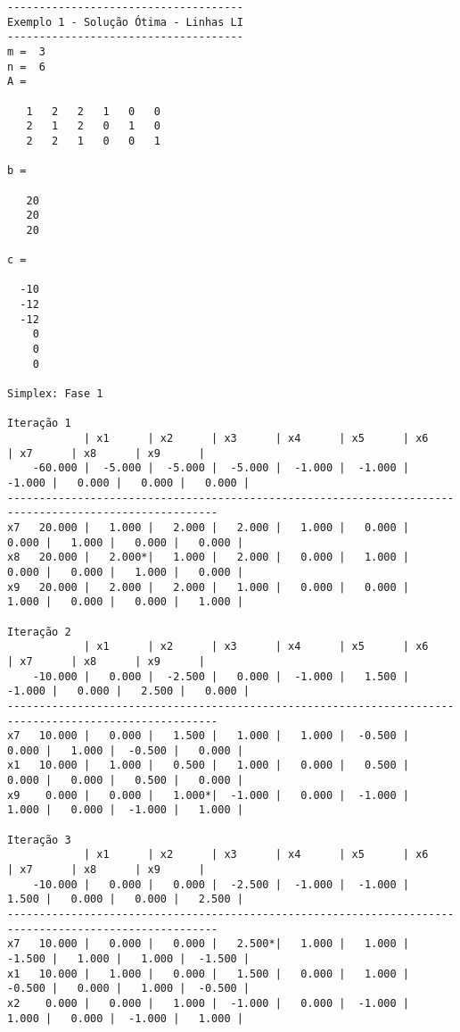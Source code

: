 \documentclass[12pt,a4paper]{article}
\begin{document}
\begin{tiny}
\begin{verbatim}
-------------------------------------
Exemplo 1 - Solução Ótima - Linhas LI
-------------------------------------
m =  3
n =  6
A =

   1   2   2   1   0   0
   2   1   2   0   1   0
   2   2   1   0   0   1

b =

   20
   20
   20

c =

  -10
  -12
  -12
    0
    0
    0

Simplex: Fase 1

Iteração 1
            | x1      | x2      | x3      | x4      | x5      | x6      | x7      | x8      | x9      |
    -60.000 |  -5.000 |  -5.000 |  -5.000 |  -1.000 |  -1.000 |  -1.000 |   0.000 |   0.000 |   0.000 |
-------------------------------------------------------------------------------------------------------
x7   20.000 |   1.000 |   2.000 |   2.000 |   1.000 |   0.000 |   0.000 |   1.000 |   0.000 |   0.000 |
x8   20.000 |   2.000*|   1.000 |   2.000 |   0.000 |   1.000 |   0.000 |   0.000 |   1.000 |   0.000 |
x9   20.000 |   2.000 |   2.000 |   1.000 |   0.000 |   0.000 |   1.000 |   0.000 |   0.000 |   1.000 |

Iteração 2
            | x1      | x2      | x3      | x4      | x5      | x6      | x7      | x8      | x9      |
    -10.000 |   0.000 |  -2.500 |   0.000 |  -1.000 |   1.500 |  -1.000 |   0.000 |   2.500 |   0.000 |
-------------------------------------------------------------------------------------------------------
x7   10.000 |   0.000 |   1.500 |   1.000 |   1.000 |  -0.500 |   0.000 |   1.000 |  -0.500 |   0.000 |
x1   10.000 |   1.000 |   0.500 |   1.000 |   0.000 |   0.500 |   0.000 |   0.000 |   0.500 |   0.000 |
x9    0.000 |   0.000 |   1.000*|  -1.000 |   0.000 |  -1.000 |   1.000 |   0.000 |  -1.000 |   1.000 |

Iteração 3
            | x1      | x2      | x3      | x4      | x5      | x6      | x7      | x8      | x9      |
    -10.000 |   0.000 |   0.000 |  -2.500 |  -1.000 |  -1.000 |   1.500 |   0.000 |   0.000 |   2.500 |
-------------------------------------------------------------------------------------------------------
x7   10.000 |   0.000 |   0.000 |   2.500*|   1.000 |   1.000 |  -1.500 |   1.000 |   1.000 |  -1.500 |
x1   10.000 |   1.000 |   0.000 |   1.500 |   0.000 |   1.000 |  -0.500 |   0.000 |   1.000 |  -0.500 |
x2    0.000 |   0.000 |   1.000 |  -1.000 |   0.000 |  -1.000 |   1.000 |   0.000 |  -1.000 |   1.000 |


\end{verbatim}
\end{tiny}
\end{document}
